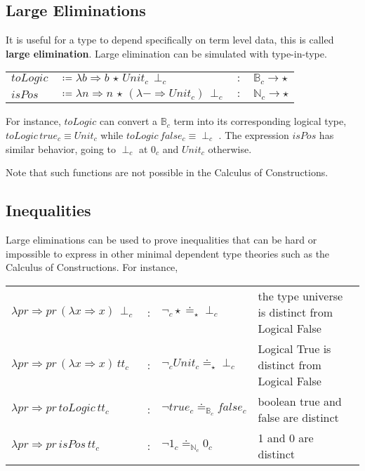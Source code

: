 
\subsection{Large Eliminations}


It is useful for a type to depend specifically on term level data,
this is called \textbf{large elimination}. Large elimination can be
simulated with type-in-type. 

\begin{tabular}{llll}
$toLogic$ & $\coloneqq\lambda b\Rightarrow b\,\star\,Unit_{c}\,\perp_{c}$ & $:$ & $\mathbb{B}_{c}\rightarrow\star$\tabularnewline
$isPos$ & $\coloneqq\lambda n\Rightarrow n\,\star\,(\lambda-\Rightarrow Unit_{c})\,\perp_{c}$ & $:$ & $\mathbb{N}_{c}\rightarrow\star$\tabularnewline
\end{tabular}

For instance, $toLogic$ can convert a $\mathbb{B}_{c}$ term into
its corresponding logical type, $toLogic\,true_{c}\equiv Unit_{c}$
while $toLogic\,false_{c}\equiv\perp_{c}$ . The expression $isPos$
has similar behavior, going to $\perp_{c}$ at $0_{c}$ and $Unit_{c}$
otherwise.

Note that such functions are not possible in the Calculus of Constructions.

\subsection{Inequalities}

Large eliminations can be used to prove inequalities that can be hard
or impossible to express in other minimal dependent type theories
such as the Calculus of Constructions. For instance,

\begin{tabular}{lcll}
$\lambda pr\Rightarrow pr\,\left(\lambda x\Rightarrow x\right)\,\perp_{c}$ & : & $\lnot_{c}\star\doteq_{\star}\perp_{c}$ & the type universe is distinct from Logical False\tabularnewline
$\lambda pr\Rightarrow pr\,\left(\lambda x\Rightarrow x\right)\,tt_{c}$ & : & $\lnot_{c}Unit_{c}\doteq_{\star}\perp_{c}$ & Logical True is distinct from Logical False\tabularnewline
$\lambda pr\Rightarrow pr\,toLogic\,tt_{c}$ & : & $\lnot true_{c}\doteq_{\mathbb{B}_{c}}false_{c}$ & boolean true and false are distinct\tabularnewline
$\lambda pr\Rightarrow pr\,isPos\,tt_{c}$ & : & $\lnot1_{c}\doteq_{\mathbb{N}_{c}}0_{c}$ & 1 and 0 are distinct\tabularnewline
\end{tabular}

